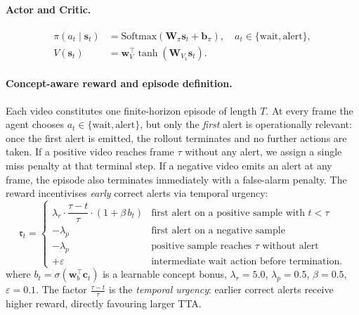 \paragraph{Actor and Critic.}
\begin{align}
  \pi(a_t \mid \mathbf{s}_t)
    &= \mathrm{Softmax}(\mathbf{W}_\pi \mathbf{s}_t + \mathbf{b}_\pi),
    \quad a_t \in \{\text{wait},\text{alert}\}, \\
  V(\mathbf{s}_t)
    &= \mathbf{w}_V^\top \tanh(\mathbf{W}_{V_1} \mathbf{s}_t).
\end{align}

\paragraph{Concept-aware reward and episode definition.}
Each video constitutes one finite-horizon episode of length $T$.
At every frame the agent chooses $a_t\in\{\text{wait},\text{alert}\}$,
but only the \emph{first} alert is operationally relevant: once the first
alert is emitted, the rollout terminates and no further actions are taken.
If a positive video reaches frame $\tau$ without any alert, we assign a single
miss penalty at that terminal step. If a negative video emits an alert at any
frame, the episode also terminates immediately with a false-alarm penalty.
The reward incentivises \emph{early} correct alerts via temporal urgency:
\begin{equation}
  \mathfrak{r}_t = \begin{cases}
    \lambda_r \cdot \dfrac{\tau - t}{\tau} \cdot (1 + \beta\, b_t)
      & \text{first alert on a positive sample with } t < \tau \\[4pt]
    -\lambda_p & \text{first alert on a negative sample} \\[4pt]
    -\lambda_p & \text{positive sample reaches } \tau \text{ without alert} \\[4pt]
    +\varepsilon & \text{intermediate wait action before termination.}
  \end{cases}
  \label{eq:reward}
\end{equation}
where $b_t = \sigma(\mathbf{w}_b^\top\mathbf{c}_t)$ is a learnable
concept bonus, $\lambda_r{=}5.0$, $\lambda_p{=}0.5$, $\beta{=}0.5$,
$\varepsilon{=}0.1$. The factor $\tfrac{\tau-t}{\tau}$ is the
\emph{temporal urgency}: earlier correct alerts receive higher reward,
directly favouring larger TTA.

